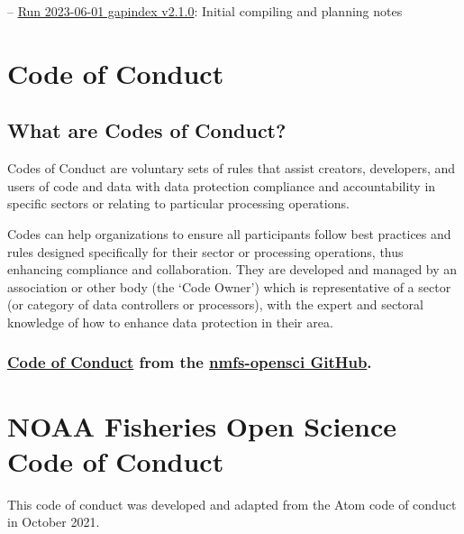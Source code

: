 \documentclass[
  letterpaper,
  oneside,
  open=any]{scrbook}
\begin{document}
--
\href{https://raw.githubusercontent.com/afsc-gap-products/gap_products/main/content/intro-news/2024-01-09.txt}{Run
2023-06-01 gapindex v2.1.0}: Initial compiling and planning notes

\hypertarget{code-of-conduct}{%
\chapter{Code of Conduct}\label{code-of-conduct}}

\hypertarget{what-are-codes-of-conduct}{%
\section{What are Codes of Conduct?}\label{what-are-codes-of-conduct}}

Codes of Conduct are voluntary sets of rules that assist creators,
developers, and users of code and data with data protection compliance
and accountability in specific sectors or relating to particular
processing operations.

Codes can help organizations to ensure all participants follow best
practices and rules designed specifically for their sector or processing
operations, thus enhancing compliance and collaboration. They are
developed and managed by an association or other body (the `Code Owner')
which is representative of a sector (or category of data controllers or
processors), with the expert and sectoral knowledge of how to enhance
data protection in their area.

\hypertarget{code-of-conduct-from-the-nmfs-opensci-github.}{%
\subsection{\texorpdfstring{\href{https://github.com/nmfs-opensci/.github/blob/main/CODE_OF_CONDUCT.md}{Code
of Conduct} from the \href{https://nmfs-opensci.github.io/}{nmfs-opensci
GitHub}.}{Code of Conduct from the nmfs-opensci GitHub.}}\label{code-of-conduct-from-the-nmfs-opensci-github.}}

\hypertarget{noaa-fisheries-open-science-code-of-conduct}{%
\chapter{NOAA Fisheries Open Science Code of
Conduct}\label{noaa-fisheries-open-science-code-of-conduct}}

This code of conduct was developed and adapted from the Atom code of
conduct in October 2021.
\end{document}

